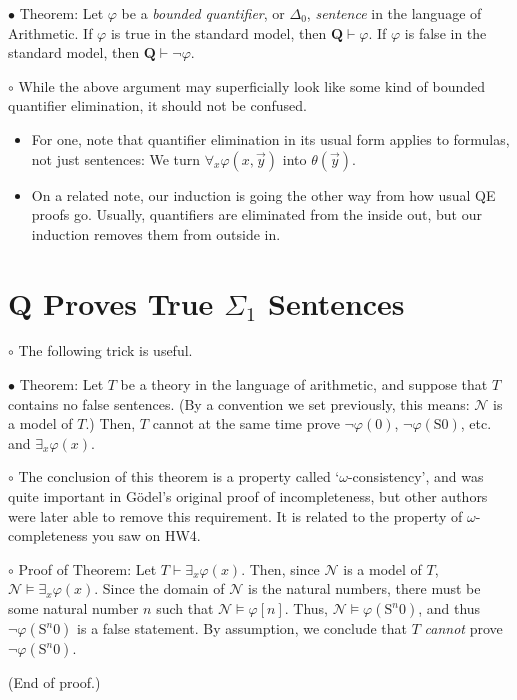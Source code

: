 \documentclass{article}
\newcommand{\RQ}{\mathbf{Q}}
\newcommand{\TN}{\mathcal{N}}
\newcommand{\suc}{\mathrm{S}}
\newcommand\Point[1]{\noindent \hspace{\labelsep} {
$\bullet$ #1} \smallskip}
\newcommand\point[1]{\noindent \hspace{\labelsep} {\small $\circ$ #1} \smallskip}
\newcommand\timestamp[1]{}
\newcommand\proofend{\hfill(End of proof.)}
\begin{document}
\Point{Theorem: Let $\varphi$ be a \emph{bounded quantifier}, or $\Delta_0$, \emph{sentence} in the language of Arithmetic. If $\varphi$ is true in the standard model, then $\RQ \vdash \varphi$. If $\varphi$ is false in the standard model, then $\RQ \vdash \neg\varphi$.}

\point{While the above argument may superficially look like some kind of bounded quantifier elimination, it should not be confused.
\begin{itemize}
\item For one, note that quantifier elimination in its usual form applies to formulas, not just sentences: We turn $\forall_x \varphi(x,\vec y)$ into $\theta(\vec y)$.
\item On a related note, our induction is going the other way from how usual QE proofs go. Usually, quantifiers are eliminated from the inside out, but our induction removes them from outside in.
\end{itemize}}

\timestamp{55 min}

\section{$\RQ$ Proves True $\Sigma_1$ Sentences}

\point{The following trick is useful.}

\Point{Theorem: Let $T$ be a theory in the language of arithmetic, and suppose that $T$ contains no false sentences. (By a convention we set previously, this means: $\TN$ is a model of $T$.) Then, $T$ cannot at the same time prove $\neg\varphi(0)$, $\neg\varphi(\suc 0)$, etc. and $\exists_x \varphi(x)$.}

\point{The conclusion of this theorem is a property called `$\omega$-consistency', and was quite important in Gödel's original proof of incompleteness, but other authors were later able to remove this requirement. It is related to the property of $\omega$-completeness you saw on HW4.}

\point{Proof of Theorem: Let $T \vdash \exists_x \varphi(x)$. Then, since $\TN$ is a model of $T$, $\TN \vDash \exists_x \varphi(x)$. Since the domain of $\TN$ is the natural numbers, there must be some natural number $n$ such that $\TN \vDash \varphi[n]$. Thus, $\TN \vDash \varphi(\suc^n 0)$, and thus $\neg\varphi(\suc^n 0)$ is a false statement. By assumption, we conclude that $T$ \emph{cannot} prove $\neg\varphi(\suc^n 0)$.

\proofend}
\end{document}
